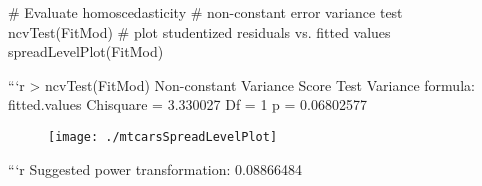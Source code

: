# Evaluate homoscedasticity
# non-constant error variance test
ncvTest(FitMod)
# plot studentized residuals vs. fitted values 
spreadLevelPlot(FitMod)



```{r}
> ncvTest(FitMod)
Non-constant Variance Score Test 
Variance formula: ~ fitted.values 
Chisquare = 3.330027    Df = 1     p = 0.06802577 



\begin{figure}[h!]
\centering
\texttt{[image: ./mtcarsSpreadLevelPlot]}
\label{mtcarsSpreadLevelPlot}
\end{figure}


```{r}
Suggested power transformation:  0.08866484 
